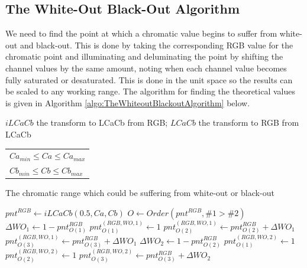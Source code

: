 \subsection{The White-Out Black-Out Algorithm}\label{sec:WhiteOutBlackOutAlgorithm}
We need to find the point at which a chromatic value begins to suffer from white-out and black-out. This is done by taking the corresponding RGB value for the chromatic point and illuminating and deluminating the point by shifting the channel values by the same amount, noting when each channel value becomes fully saturated or desaturated. This is done in the unit space so the results can be scaled to any working range. The algorithm for finding the theoretical values is given in Algorithm \ref{algo:TheWhiteoutBlackoutAlgorithm} below. 

\begin{algorithm}[H]
 \begin{algorithmic}
  \State \phantom{Require}  { $iLCaCb$ the transform to LCaCb from RGB; }
  \State \phantom{Require}  {  $LCaCb$ the transform to RGB from LCaCb}
 \State \phantom{Ensu} { \begin{tabular}{l}
 $Ca_{min}  \le Ca \le Ca_{max}$   \\ 
 $Cb_{min}  \le Cb \le Cb_{max}$  
 \end{tabular}  \parbox{0.65 \textwidth}{The chromatic range which could be suffering from white-out or black-out}}
 
   \State  $pnt^{RGB} \gets iLCaCb(0.5, Ca,Cb)$ 
   \State  $O \gets Order(pnt^{RGB}, \#1> \#2)$ 
   \State  $\Delta WO_1 \gets 1 - pnt^{RGB}_{O(1)} $ 
   \State  \phantom{Set} $pnt^{(RGB, WO, 1)}_{O(1)} \gets 1 $ 
   \State  \phantom{Set} $pnt^{(RGB, WO, 1)}_{O(2)} \gets  pnt^{RGB} _{O(2)} + \Delta WO_1 $ 
   \State  \phantom{Set} $pnt^{(RGB, WO, 1)}_{O(3)} \gets  pnt^{RGB} _{O(3)} + \Delta WO_1 $ 
   \State  $\Delta WO_2 \gets 1 - pnt^{RGB}_{O(2)} $
   \State  \phantom{Set}$pnt^{(RGB, WO, 2)}_{O(1)} \gets 1 $ 
   \State  \phantom{Set}$pnt^{(RGB, WO, 2)}_{O(2)} \gets 1 $ 
   \State  \phantom{Set}$pnt^{(RGB, WO, 2)}_{O(3)} \gets  pnt^{RGB} _{O(3)} + \Delta WO_2 $ 
     

\end{algorithmic}
\end{algorithm}
